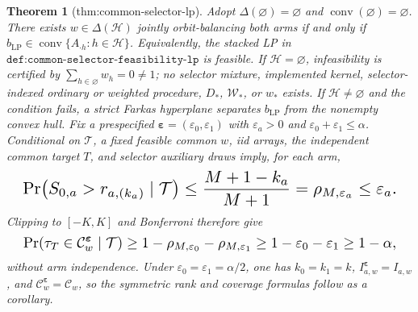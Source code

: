 \documentclass{article}
\newtheorem{theorem}{Theorem}
\begin{document}
\begin{theorem}[thm:common-selector-lp]\label{thm:common-selector-lp}
Adopt \(\Delta(\varnothing)=\varnothing\) and \(\operatorname{conv}(\varnothing)=\varnothing\). There exists \(w\in\Delta(\mathcal H)\) jointly orbit-balancing both arms if and only if \(b_{\mathrm{LP}}\in\operatorname{conv}\{A_{\cdot h}:h\in\mathcal H\}\). Equivalently, the stacked LP in \(\texttt{def:common-selector-feasibility-lp}\) is feasible. If \(\mathcal H=\varnothing\), infeasibility is certified by \(\sum_{h\in\varnothing}w_h=0\ne1\); no selector mixture, implemented kernel, selector-indexed ordinary or weighted procedure, \(D_*\), \(\mathcal W_*\), or \(w_*\) exists. If \(\mathcal H\ne\varnothing\) and the condition fails, a strict Farkas hyperplane separates \(b_{\mathrm{LP}}\) from the nonempty convex hull. Fix a prespecified \(\boldsymbol\varepsilon=(\varepsilon_0,\varepsilon_1)\) with \(\varepsilon_a>0\) and \(\varepsilon_0+\varepsilon_1\le\alpha\). Conditional on \(\mathcal T\), a fixed feasible common \(w\), iid arrays, the independent common target \(T\), and selector auxiliary draws imply, for each arm, \[
\makebox[\linewidth][c]{\resizebox{0.98\linewidth}{!}{\par\noindent \makebox[\linewidth][c]{\resizebox{0.98\linewidth}{!}{\(\displaystyle \displaystyle \Pr\!\left(S_{0,a}>r_{a,(k_a)}\mid\mathcal T\right)\le\frac{M+1-k_a}{M+1}=\rho_{M,\varepsilon_a}\le\varepsilon_a.\)}}\par\noindent}}
\] Clipping to \([-K,K]\) and Bonferroni therefore give \[
\makebox[\linewidth][c]{\resizebox{0.98\linewidth}{!}{\par\noindent \makebox[\linewidth][c]{\resizebox{0.98\linewidth}{!}{\(\displaystyle \displaystyle \Pr\!\left(\tau_T\in\mathcal C^{\boldsymbol\varepsilon}_w\mid\mathcal T\right)\ge1-\rho_{M,\varepsilon_0}-\rho_{M,\varepsilon_1}\ge1-\varepsilon_0-\varepsilon_1\ge1-\alpha,\)}}\par\noindent}}
\] without arm independence. Under \(\varepsilon_0=\varepsilon_1=\alpha/2\), one has \(k_0=k_1=k\), \(I^{\boldsymbol\varepsilon}_{a,w}=I_{a,w}\), and \(\mathcal C^{\boldsymbol\varepsilon}_w=\mathcal C_w\), so the symmetric rank and coverage formulas follow as a corollary.
\end{theorem}
\end{document}
